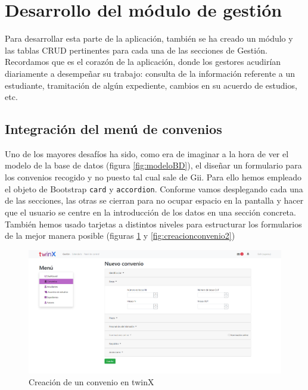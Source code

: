 \section{Desarrollo del módulo de gestión}
\label{sec:gestion}

Para desarrollar esta parte de la aplicación, también se ha creado un módulo y las tablas CRUD pertinentes para cada una de las secciones de Gestión. Recordamos que es el corazón de la aplicación, donde los gestores acudirían diariamente a desempeñar su trabajo: consulta de la información referente a un estudiante, tramitación de algún expediente, cambios en su acuerdo de estudios, etc.

\subsection{Integración del menú de convenios}

Uno de los mayores desafíos ha sido, como era de imaginar a la hora de ver el modelo de la base de datos (figura \ref{fig:modeloBD}), el diseñar un formulario para los convenios recogido y no puesto tal cual sale de Gii. Para ello hemos empleado el objeto de Bootstrap \texttt{card} y \texttt{accordion}. Conforme vamos desplegando cada una de las secciones, las otras se cierran para no ocupar espacio en la pantalla y hacer que el usuario se centre en la introducción de los datos en una sección concreta. También hemos usado tarjetas a distintos niveles para estructurar los formularios de la mejor manera posible (figuras \ref{fig:creacionconvenio1} y \ref{fig:creacionconvenio2})

\begin{figure}
	\centering
	\includegraphics[width=\textwidth]{Capturas de twinX/creacion_convenio_1}
	\caption{Creación de un convenio en twinX}
	\label{fig:creacionconvenio1}
\end{figure}

